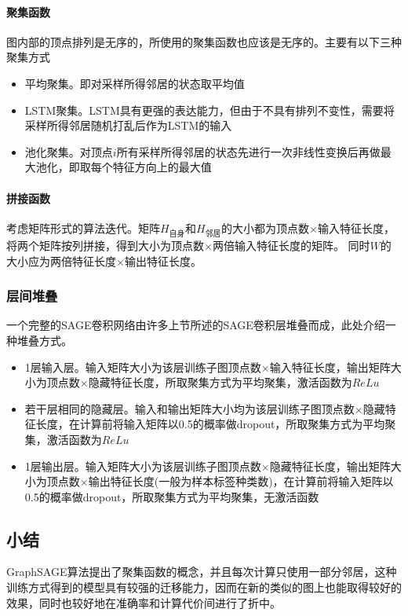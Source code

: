 \paragraph{聚集函数}
图内部的顶点排列是无序的，所使用的聚集函数也应该是无序的。主要有以下三种聚集方式
\begin{itemize}
    \item 平均聚集。即对采样所得邻居的状态取平均值
    \item LSTM聚集。LSTM具有更强的表达能力，但由于不具有排列不变性，需要将采样所得邻居随机打乱后作为LSTM的输入
    \item 池化聚集。对顶点$i$所有采样所得邻居的状态先进行一次非线性变换后再做最大池化，即取每个特征方向上的最大值
\end{itemize}

\paragraph{拼接函数}
考虑矩阵形式的算法迭代。矩阵$H_{自身}$和$H_{邻居}$的大小都为顶点数$\times$输入特征长度，将两个矩阵按列拼接，得到大小为顶点数$\times$两倍输入特征长度的矩阵。
同时$W$的大小应为两倍特征长度$\times$输出特征长度。

\subsubsection{层间堆叠}
一个完整的SAGE卷积网络由许多上节所述的SAGE卷积层堆叠而成，此处介绍一种堆叠方式。

\begin{itemize}
    \item 1层输入层。输入矩阵大小为该层训练子图顶点数$\times$输入特征长度，输出矩阵大小为顶点数$\times$隐藏特征长度，所取聚集方式为平均聚集，激活函数为$ReLu$
    \item 若干层相同的隐藏层。输入和输出矩阵大小均为该层训练子图顶点数$\times$隐藏特征长度，在计算前将输入矩阵以0.5的概率做dropout，所取聚集方式为平均聚集，激活函数为$ReLu$
    \item 1层输出层。输入矩阵大小为该层训练子图顶点数$\times$隐藏特征长度，输出矩阵大小为顶点数$\times$输出特征长度(一般为样本标签种类数)，在计算前将输入矩阵以0.5的概率做dropout，所取聚集方式为平均聚集，无激活函数
\end{itemize}

\subsection{小结}
GraphSAGE算法提出了聚集函数的概念，并且每次计算只使用一部分邻居，这种训练方式得到的模型具有较强的迁移能力，因而在新的类似的图上也能取得较好的效果，同时也较好地在准确率和计算代价间进行了折中。

